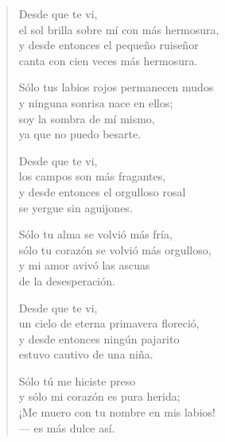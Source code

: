 \documentclass[11pt]{extbook}
\newcommand*{\centeredornament}{\centerline{\pgfornament[width=6cm]{88}}}
\begin{document}
\begin{verse}
  Desde que te vi, \\
  el sol brilla sobre mí con más hermosura, \\
  y desde entonces el pequeño ruiseñor \\
  canta con cien veces más hermosura.

  Sólo tus labios rojos permanecen mudos \\
  y ninguna sonrisa nace en ellos; \\
  soy la sombra de mí mismo, \\
  ya que no puedo besarte.

  Desde que te vi, \\
  los campos son más fragantes, \\
  y desde entonces el orgulloso rosal \\
  se yergue sin aguijones.

  Sólo tu alma se volvió más fría, \\
  sólo tu corazón se volvió más orgulloso, \\
  y mi amor avivó las ascuas \\
  de la desesperación.

  Desde que te vi, \\
  un cielo de eterna primavera floreció, \\
  y desde entonces ningún pajarito \\
  estuvo cautivo de una niña.

  Sólo tú me hiciste preso \\
  y sólo mi corazón es pura herida; \\
  ¡Me muero con tu nombre en mis labios! \\
  --- es más dulce así.
\end{verse}

\newpage

\vspace*{-15mm}
\centeredornament


\end{document}
